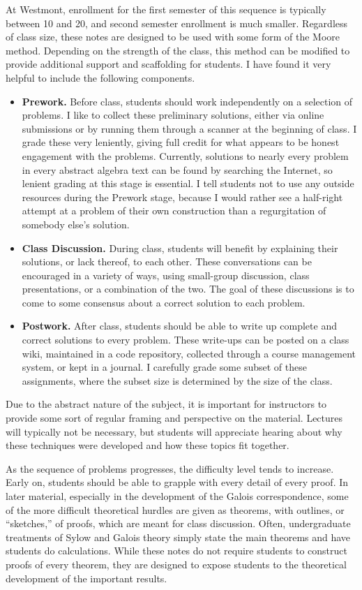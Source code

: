 \begin{annotation}
At Westmont, enrollment for the first semester of this sequence is typically between 10 and 20, and second semester enrollment is much smaller. Regardless of class size, these notes are designed to be used with some form of the Moore method. Depending on the strength of the class, this method can be modified to provide additional support and scaffolding for students. I have found it very helpful to include the following components.
\begin{itemize}
    \item \textbf{Prework.} Before class, students should work independently on a selection of problems. I like to collect these preliminary solutions, either via online submissions or by running them through a scanner at the beginning of class. I grade these very leniently, giving full credit for what appears to be honest engagement with the problems. Currently, solutions to nearly every problem in every abstract algebra text can be found by searching the Internet, so lenient grading at this stage is essential. I tell students not to use any outside resources during the Prework stage, because I would rather see a half-right attempt at a problem of their own construction than a regurgitation of somebody else's solution.
    \item \textbf{Class Discussion.} During class, students will benefit by explaining their solutions, or lack thereof, to each other. These conversations can be encouraged in a variety of ways, using small-group discussion, class presentations, or a combination of the two. The goal of these discussions is to come to some consensus about a correct solution to each problem.
    \item \textbf{Postwork.} After class, students should be able to write up complete and correct solutions to every problem. These write-ups can be posted on a class wiki, maintained in a code repository, collected through a course management system, or kept in a journal. I carefully grade some subset of these assignments, where the subset size is determined by the size of the class.
\end{itemize}

Due to the abstract nature of the subject, it is important for instructors to provide some sort of regular framing and perspective on the material. Lectures will typically not be necessary, but students will appreciate hearing about why these techniques were developed and how these topics fit together.

As the sequence of problems progresses, the difficulty level tends to increase. Early on, students should be able to grapple with every detail of every proof. In later material, especially in the development of the Galois correspondence, some of the more difficult theoretical hurdles are given as theorems, with outlines, or ``sketches,'' of proofs, which are meant for class discussion. Often, undergraduate treatments of Sylow and Galois theory simply state the main theorems and have students do calculations. While these notes do not require students to construct proofs of every theorem, they are designed to expose students to the theoretical development of the important results.


\end{annotation}
